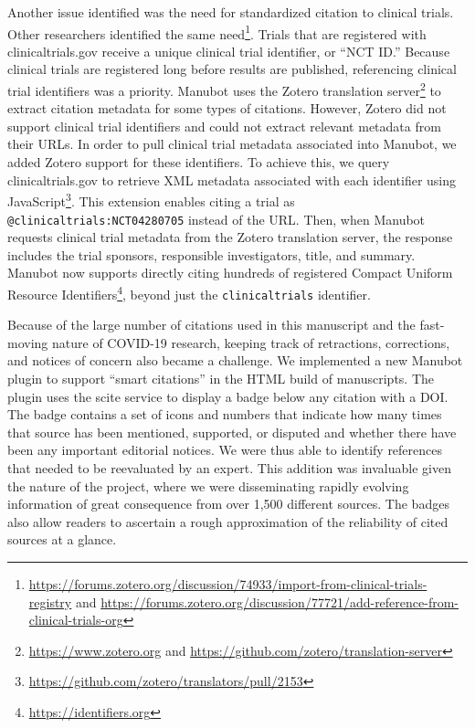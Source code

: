 \documentclass[twocolumn]{ceurart}
\begin{document}
Another issue identified was the need for standardized citation to clinical trials.
Other researchers identified the same need\footnote{\url{https://forums.zotero.org/discussion/74933/import-from-clinical-trials-registry} and \url{https://forums.zotero.org/discussion/77721/add-reference-from-clinical-trials-org}}.
Trials that are registered with clinicaltrials.gov receive a unique clinical trial identifier, or ``NCT ID.''
Because clinical trials are registered long before results are published, referencing clinical trial identifiers was a priority.
Manubot uses the Zotero translation server\footnote{\url{https://www.zotero.org} and \url{https://github.com/zotero/translation-server}} to extract citation metadata for some types of citations.
However, Zotero did not support clinical trial identifiers and could not extract relevant metadata from their URLs.
In order to pull clinical trial metadata associated into Manubot, we added Zotero support for these identifiers.
To achieve this, we query clinicaltrials.gov to retrieve XML metadata associated with each identifier using JavaScript\footnote{\url{https://github.com/zotero/translators/pull/2153}}.
This extension enables citing a trial as \texttt{@clinicaltrials:NCT04280705} instead of the URL.
Then, when Manubot requests clinical trial metadata from the Zotero translation server, the response includes the trial sponsors, responsible investigators, title, and summary.
Manubot now supports directly citing hundreds of registered Compact Uniform Resource Identifiers\footnote{\url{https://identifiers.org}}, beyond just the \texttt{clinicaltrials} identifier.

Because of the large number of citations used in this manuscript and the fast-moving nature of COVID-19 research, keeping track of retractions, corrections, and notices of concern also became a challenge.
We implemented a new Manubot plugin to support ``smart citations'' in the HTML build of manuscripts.
The plugin uses the scite \citep{14UJbLWf4} service to display a badge below any citation with a DOI.
The badge contains a set of icons and numbers that indicate how many times that source has been mentioned, supported, or disputed and whether there have been any important editorial notices.
We were thus able to identify references that needed to be reevaluated by an expert.
This addition was invaluable given the nature of the project, where we were disseminating rapidly evolving information of great consequence from over 1,500 different sources.
The badges also allow readers to ascertain a rough approximation of the reliability of cited sources at a glance.
\end{document}
